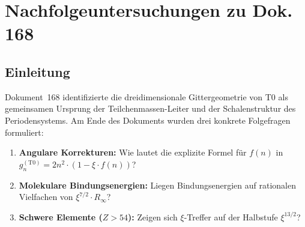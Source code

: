 
\chapter{Nachfolgeuntersuchungen zu Dok.\,168}
\label{chap:nachfolge168}

\begin{abstract}
Dokument~168 formulierte drei offene Fragen zur Verbindung zwischen
der $\xi$-Geometrie und dem Periodensystem. Dieses Dokument beantwortet
sie abschließend.
(1)~Die angulare Korrektur lautet $g_n^{(\mathrm{T0})} = 2n^{2-\xi}$;
die maximale Abweichung von $2n^2$ beträgt $|\delta g_7| \approx 0{,}025$
bei $n=7$ ($Z\approx118$) — unter jeder messbaren Grenze.
(2)~Molekulare Bindungsenergien zeigen kein systematisches Muster
als Vielfache von $R_\infty$; die C=O-Bindung ist eine Ausnahme
mit $4/7 \cdot R_\infty$ und $0{,}06\%$ Abweichung.
(3)~Die relativistische Korrektur $IE_\mathrm{korr} = IE/(1+Z^2\xi)$
ergibt für schwere Elemente ($Z>54$) Ionisierungsenergien auf
rationalen Brüchen von $R_\infty$ mit Abweichungen unter $1{,}3\%$.
Dies ist eine testbare T0-Vorhersage, die sich vom QED-Ergebnis
($\propto \alpha^2 Z^2$) durch einen Faktor $\xi/\alpha^2 \approx 18$
unterscheidet.
\end{abstract}

\section{Einleitung}
\label{sec:169-einleitung}

Dokument~168 \cite{dok168} identifizierte die dreidimensionale
Gittergeometrie von T0 als gemeinsamen Ursprung der Teilchenmassen-Leiter
und der Schalenstruktur des Periodensystems.
Am Ende des Dokuments wurden drei konkrete Folgefragen formuliert:

\begin{enumerate}
  \item \textbf{Angulare Korrekturen:}
    Wie lautet die explizite Formel für $f(n)$ in
    $g_n^{(\mathrm{T0})} = 2n^2 \cdot (1 - \xi \cdot f(n))$?
  \item \textbf{Molekulare Bindungsenergien:}
    Liegen Bindungsenergien auf rationalen Vielfachen von
    $\xi^{7/2} \cdot R_\infty$?
  \item \textbf{Schwere Elemente ($Z > 54$):}
    Zeigen sich $\xi$-Treffer auf der Halbstufe $\xi^{13/2}$?
\end{enumerate}

